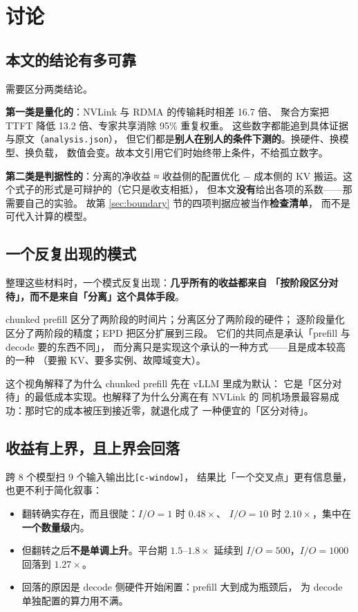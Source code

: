 \section{讨论}
\label{sec:discuss}

\subsection{本文的结论有多可靠}

需要区分两类结论。

\textbf{第一类是量化的}：NVLink 与 RDMA 的传输耗时相差 16.7 倍、
聚合方案把 TTFT 降低 13.2 倍、专家共享消除 95\% 重复权重。
这些数字都能追到具体证据与原文（\texttt{analysis.json}），
但它们都是\textbf{别人在别人的条件下测的}。换硬件、换模型、换负载，
数值会变。故本文引用它们时始终带上条件，不给孤立数字。

\textbf{第二类是判据性的}：分离的净收益 ≈ 收益侧的配置优化
$-$ 成本侧的 KV 搬运。这个式子的形式是可辩护的（它只是收支相抵），
但本文\textbf{没有}给出各项的系数——那需要自己的实验。
故第 \ref{sec:boundary} 节的四项判据应被当作\textbf{检查清单}，
而不是可代入计算的模型。

\subsection{一个反复出现的模式}

整理这些材料时，一个模式反复出现：\textbf{几乎所有的收益都来自
「按阶段区分对待」，而不是来自「分离」这个具体手段}。

chunked prefill 区分了两阶段的时间片；分离区分了两阶段的硬件；
逐阶段量化区分了两阶段的精度；EPD 把区分扩展到三段。
它们的共同点是承认「prefill 与 decode 要的东西不同」，
而分离只是实现这个承认的一种方式——且是成本较高的一种
（要搬 KV、要多实例、故障域变大）。

这个视角解释了为什么 chunked prefill 先在 vLLM 里成为默认：
它是「区分对待」的最低成本实现。也解释了为什么分离在有 NVLink 的
同机场景最容易成功：那时它的成本被压到接近零，就退化成了
一种便宜的「区分对待」。

\subsection{收益有上界，且上界会回落}

跨 8 个模型扫 9 个输入输出比\texttt{[c-window]}，
结果比「一个交叉点」更有信息量，也更不利于简化叙事：

\begin{itemize}[leftmargin=1.3em,itemsep=1.5pt,topsep=2pt]
  \item 翻转确实存在，而且很陡：$I/O=1$ 时 $0.48\times$、
        $I/O=10$ 时 $2.10\times$，集中在\textbf{一个数量级}内。
  \item 但翻转之后\textbf{不是单调上升}。平台期 $1.5$--$1.8\times$
        延续到 $I/O=500$，$I/O=1000$ 回落到 $1.27\times$。
  \item 回落的原因是 decode 侧硬件开始闲置：prefill 大到成为瓶颈后，
        为 decode 单独配置的算力用不满。
\end{itemize}

